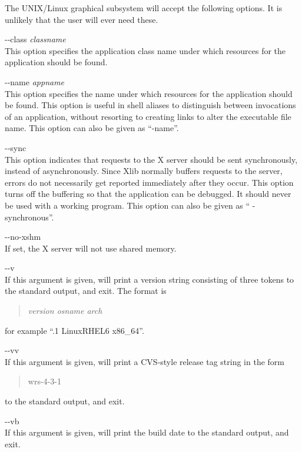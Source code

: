 The UNIX/Linux graphical subsystem will accept the following options. 
It is unlikely that the user will ever need these.

\begin{description}
\item{\vt -\/-class} {\it classname}\\
This option specifies the application class name under which resources
for the application should be found.

\item{\vt -\/-name} {\it appname}\\
This option specifies the name under which resources for the
application should be found.  This option is useful in shell aliases
to distinguish between invocations of an application, without
resorting to creating links to alter the executable file name.
This option can also be given as ``{\vt -name}''.

\item{\vt -\/-sync}\\
This option indicates that requests to the X server should be sent
synchronously, instead of asynchronously.  Since Xlib normally buffers
requests to the server, errors do not necessarily get reported
immediately after they occur.  This option turns off the buffering so
that the application can be debugged.  It should never be used with a
working program.  This option can also be given as ``{\vt
-synchronous}''.

\item{\vt -\/-no-xshm}\\
If set, the X server will not use shared memory.

\item{\vt -\/-v}\\
If this argument is given, {\WRspice} will print a version string
consisting of three tokens to the standard output, and exit.  The
format is
\begin{quote}
{\it version osname arch}
\end{quote}
for example ``{.1 LinuxRHEL6 x86\_64}''.

\item{\vt -\/-vv}\\
If this argument is given, {\WRspice} will print a CVS-style release
tag string in the form
\begin{quote}
{\vt wrs-4-3-1}
\end{quote}
to the standard output, and exit.

\item{\vt -\/-vb}\\
If this argument is given, {\WRspice} will print the build date to the
standard output, and exit.
\end{description}



